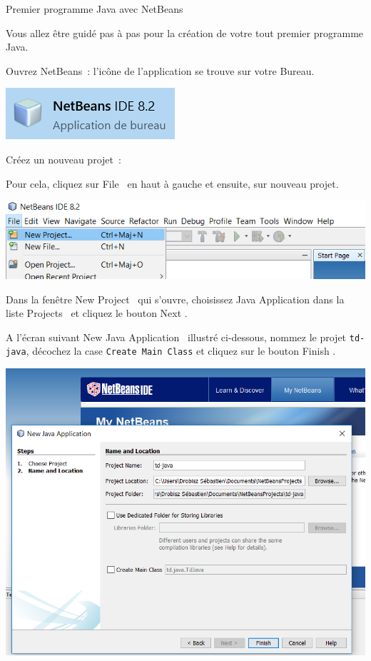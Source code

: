 \documentclass[a4paper,11pt]{article}
\begin{document}
	\begin{Tutoriel}{Premier programme Java avec NetBeans}
	
	Vous allez être guidé pas à pas pour la création de votre tout premier programme Java.
	
	\begin{steps}
		\item Ouvrez NetBeans~:
			l'icône de l'application se trouve sur votre Bureau. 
		
			\bigskip
			\begin{center}
				\includegraphics{images/nb_icone}
			\end{center}


		\item Créez un nouveau projet~: 
		
			Pour cela, cliquez sur \og File \fg~en haut à gauche et ensuite, sur nouveau projet. 
			
			\bigskip
			\begin{center}
				\includegraphics[width=.9\textwidth]{images/nb_newproject}
			\end{center}
			
			Dans la fenêtre \og New Project \fg~qui s'ouvre, choisissez \og Java Application \fg dans la liste \og Projects \fg~et cliquez le bouton \og Next \fg.
			
			A l'écran suivant \og New Java Application \fg~illustré ci-dessous, 
			nommez le projet \texttt{td-java}, décochez la case \texttt{Create Main Class} et cliquez sur le bouton \og Finish \fg.
			
			\begin{center}
				\includegraphics[width=.9\textwidth]{images/nb_newproject_name}
			\end{center}
			

\end{steps}
\end{Tutoriel}
\end{document}
